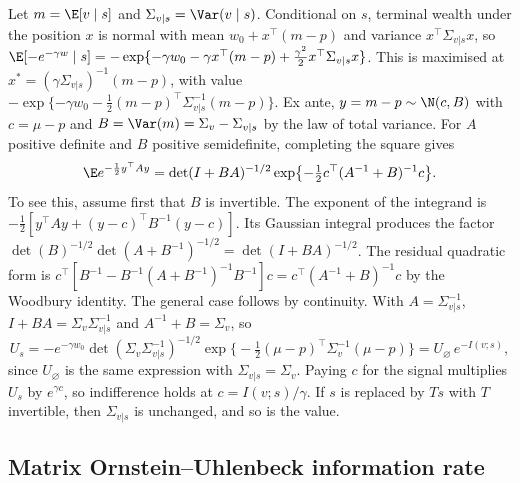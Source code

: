 Let $m=\E[v\mid s]$ and $\Sigma_{v|s}=\Var(v\mid s)$. Conditional on $s$, terminal wealth under the position $x$ is normal with mean $w_0+x^\top(m-p)$ and variance $x^\top\Sigma_{v|s}x$, so $\E[-e^{-\gamma w}\mid s]=-\exp\{-\gamma w_0-\gamma x^\top(m-p)+\tfrac{\gamma^2}2x^\top\Sigma_{v|s}x\}$. This is maximised at $x^*=(\gamma\Sigma_{v|s})^{-1}(m-p)$, with value $-\exp\{-\gamma w_0-\tfrac12(m-p)^\top\Sigma_{v|s}^{-1}(m-p)\}$. Ex ante, $y=m-p\sim\N(c,B)$ with $c=\mu-p$ and $B=\Var(m)=\Sigma_v-\Sigma_{v|s}$ by the law of total variance. For $A$ positive definite and $B$ positive semidefinite, completing the square gives
\[
 \E e^{-\frac12y^\top Ay}=\det(I+BA)^{-1/2}\exp\bigl\{-\tfrac12c^\top(A^{-1}+B)^{-1}c\bigr\}.
\]
To see this, assume first that $B$ is invertible. The exponent of the integrand is $-\tfrac12[y^\top Ay+(y-c)^\top B^{-1}(y-c)]$. Its Gaussian integral produces the factor $\det(B)^{-1/2}\det(A+B^{-1})^{-1/2}=\det(I+BA)^{-1/2}$. The residual quadratic form is $c^\top[B^{-1}-B^{-1}(A+B^{-1})^{-1}B^{-1}]c=c^\top(A^{-1}+B)^{-1}c$ by the Woodbury identity. The general case follows by continuity. With $A=\Sigma_{v|s}^{-1}$, $I+BA=\Sigma_v\Sigma_{v|s}^{-1}$ and $A^{-1}+B=\Sigma_v$, so
\[
 U_s=-e^{-\gamma w_0}\det(\Sigma_v\Sigma_{v|s}^{-1})^{-1/2}\exp\bigl\{-\tfrac12(\mu-p)^\top\Sigma_v^{-1}(\mu-p)\bigr\}=U_\varnothing\,e^{-I(v;s)},
\]
since $U_\varnothing$ is the same expression with $\Sigma_{v|s}=\Sigma_v$. Paying $c$ for the signal multiplies $U_s$ by $e^{\gamma c}$, so indifference holds at $c=I(v;s)/\gamma$. If $s$ is replaced by $Ts$ with $T$ invertible, then $\Sigma_{v|s}$ is unchanged, and so is the value.

\subsection*{Matrix Ornstein--Uhlenbeck information rate}

